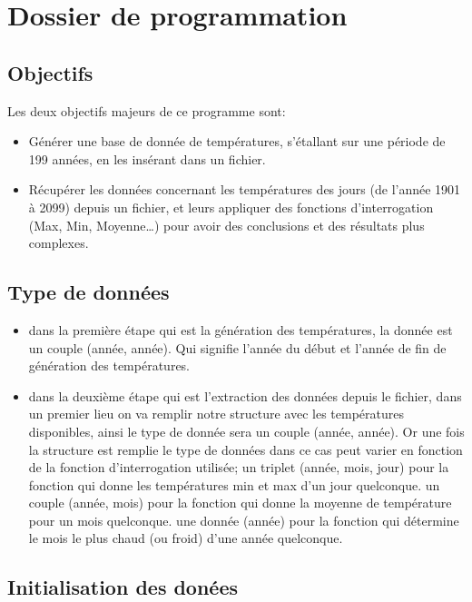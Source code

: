 \section{Dossier de programmation}

\subsection{Objectifs}
Les deux objectifs majeurs de ce programme sont:

\begin{itemize}
  \item Générer une base de donnée de températures, s’étallant sur une période de 199 années,
   en les insérant dans un fichier.
   
  \item Récupérer les données concernant les températures des jours (de l’année 1901 à 2099) 
  depuis un fichier, et leurs appliquer des fonctions d’interrogation (Max, Min, Moyenne…)
  pour avoir des conclusions et des résultats plus complexes.
\end{itemize}

\subsection{Type de données}

\begin{itemize}
  \item dans la première étape qui est la génération des températures, la donnée est un couple (année, année). Qui signifie l’année du début et l’année de fin de génération des températures.
  
  \item dans la deuxième étape qui est l’extraction des données depuis le fichier, 
dans un premier lieu on va remplir notre structure avec les températures disponibles,
 ainsi le type de donnée sera un couple (année, année). Or une fois la structure est 
 remplie le type de données dans ce cas peut varier en fonction de la fonction d’interrogation utilisée;
un triplet (année, mois, jour) pour la fonction qui donne les températures min et max d’un jour quelconque.
un couple (année, mois) pour la fonction qui donne la moyenne de température pour un mois quelconque.
une donnée (année) pour la fonction qui détermine le mois le plus chaud (ou froid) d’une année quelconque.

\end{itemize}

\subsection{Initialisation des donées}

